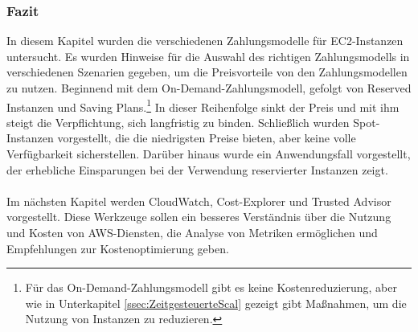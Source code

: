 \subsubsection*{Fazit}%
In diesem Kapitel wurden die verschiedenen Zahlungsmodelle für EC2-Instanzen untersucht. Es wurden Hinweise für die Auswahl des richtigen Zahlungsmodells in verschiedenen Szenarien gegeben, um die Preisvorteile von den Zahlungsmodellen zu nutzen. Beginnend mit dem On-Demand-Zahlungsmodell, gefolgt von Reserved Instanzen und Saving Plans.\footnote{Für das On-Demand-Zahlungsmodell gibt es keine Kostenreduzierung, aber wie in Unterkapitel \ref{ssec:ZeitgesteuerteScal} gezeigt gibt Maßnahmen, um die Nutzung von Instanzen zu reduzieren.} In dieser Reihenfolge sinkt der Preis und mit ihm steigt die Verpflichtung, sich langfristig zu binden. Schließlich wurden Spot-Instanzen vorgestellt, die die niedrigsten Preise bieten, aber keine volle Verfügbarkeit sicherstellen. %
Darüber hinaus wurde ein Anwendungsfall vorgestellt, der erhebliche Einsparungen bei der Verwendung reservierter Instanzen zeigt.
\\\\
Im nächsten Kapitel werden CloudWatch, Cost-Explorer und Trusted Advisor vorgestellt. Diese Werkzeuge sollen ein besseres Verständnis über die Nutzung und Kosten von AWS-Diensten, die Analyse von Metriken ermöglichen und Empfehlungen zur Kostenoptimierung geben.
